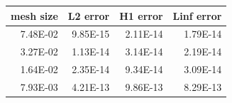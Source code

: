 \begin{tabular}{rrrr}
\toprule
mesh size & L2 error & H1 error & Linf error \\
\midrule
7.48E-02 & 9.85E-15 & 2.11E-14 & 1.79E-14 \\
3.27E-02 & 1.13E-14 & 3.14E-14 & 2.19E-14 \\
1.64E-02 & 2.35E-14 & 9.34E-14 & 3.09E-14 \\
7.93E-03 & 4.21E-13 & 9.86E-13 & 8.29E-13 \\
\bottomrule
\end{tabular}
